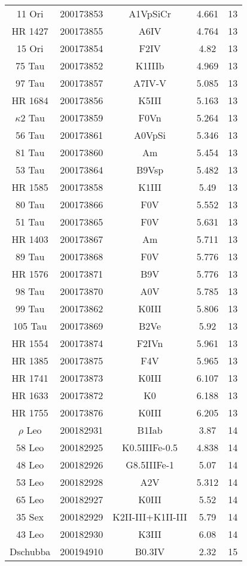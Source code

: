\begin{table*}
\begin{tabular}{ccccc}
11 Ori & 200173853 & A1VpSiCr & 4.661 & 13 \\
HR 1427 & 200173855 & A6IV & 4.764 & 13 \\
15 Ori & 200173854 & F2IV & 4.82 & 13 \\
75 Tau & 200173852 & K1IIIb & 4.969 & 13 \\
97 Tau & 200173857 & A7IV-V & 5.085 & 13 \\
HR 1684 & 200173856 & K5III & 5.163 & 13 \\
$\kappa$2 Tau & 200173859 & F0Vn & 5.264 & 13 \\
56 Tau & 200173861 & A0VpSi & 5.346 & 13 \\
81 Tau & 200173860 & Am & 5.454 & 13 \\
53 Tau & 200173864 & B9Vsp & 5.482 & 13 \\
HR 1585 & 200173858 & K1III & 5.49 & 13 \\
80 Tau & 200173866 & F0V & 5.552 & 13 \\
51 Tau & 200173865 & F0V & 5.631 & 13 \\
HR 1403 & 200173867 & Am & 5.711 & 13 \\
89 Tau & 200173868 & F0V & 5.776 & 13 \\
HR 1576 & 200173871 & B9V & 5.776 & 13 \\
98 Tau & 200173870 & A0V & 5.785 & 13 \\
99 Tau & 200173862 & K0III & 5.806 & 13 \\
105 Tau & 200173869 & B2Ve & 5.92 & 13 \\
HR 1554 & 200173874 & F2IVn & 5.961 & 13 \\
HR 1385 & 200173875 & F4V & 5.965 & 13 \\
HR 1741 & 200173873 & K0III & 6.107 & 13 \\
HR 1633 & 200173872 & K0 & 6.188 & 13 \\
HR 1755 & 200173876 & K0III & 6.205 & 13 \\
$\rho$ Leo & 200182931 & B1Iab & 3.87 & 14 \\
58 Leo & 200182925 & K0.5IIIFe-0.5 & 4.838 & 14 \\
48 Leo & 200182926 & G8.5IIIFe-1 & 5.07 & 14 \\
53 Leo & 200182928 & A2V & 5.312 & 14 \\
65 Leo & 200182927 & K0III & 5.52 & 14 \\
35 Sex & 200182929 & K2II-III+K1II-III & 5.79 & 14 \\
43 Leo & 200182930 & K3III & 6.08 & 14 \\
Dschubba & 200194910 & B0.3IV & 2.32 & 15 \\

\end{tabular}
\end{table*}
